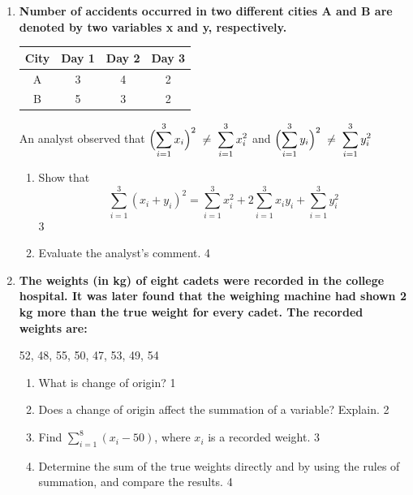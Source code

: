 \documentclass[a4paper,oneside]{book}
\begin{document}
\begin{enumerate}
 \item
  \textbf{Number of accidents occurred in two different cities A and B are denoted by two variables x and y, respectively.} 
  
  \begin{table}[h]
  \centering
\begin{tabular}{c|c|c|c}
City & Day 1 & Day 2 & Day 3 \\ \hline
A    & 3     & 4     & 2     \\
B    & 5     & 3     & 2    
\end{tabular}
\end{table}
  
  An analyst observed that $\displaystyle \Bigl(\sum_{i=1}^{3} x_i\Bigr)^2 \;\neq\; \sum_{i=1}^{3} x_i^2$ and  $\displaystyle \Bigl(\sum_{i=1}^{3} y_i\Bigr)^2 \;\neq\; \sum_{i=1}^{3} y_i^2$
  
  \begin{enumerate}
    \item  Show that 
	\[
\sum_{i=1}^{3} (x_i + y_i)^2 = \sum_{i=1}^{3} x_i^2 + 2\sum_{i=1}^{3} x_i y_i + \sum_{i=1}^{3} y_i^2
\] \hfill 3
    \item
	Evaluate the analyst's comment. \hfill 4
  \end{enumerate}
  

\item
\textbf{The weights (in kg) of eight cadets were recorded in the college hospital. It was later found that the weighing machine had shown 2 kg more than the true weight for every cadet. The recorded weights are:}
\begin{center}
52, 48, 55, 50, 47, 53, 49, 54
\end{center}
\begin{enumerate}
  \item What is change of origin? \hfill 1
  \item Does a change of origin affect the summation of a variable? Explain. \hfill 2
  \item Find $\displaystyle \sum_{i=1}^{8} (x_i-50)$, where $x_i$ is a recorded weight. \hfill 3
  \item Determine the sum of the true weights directly and by using the rules of summation, and compare the results. \hfill 4
\end{enumerate}


\end{enumerate}
\end{document}
